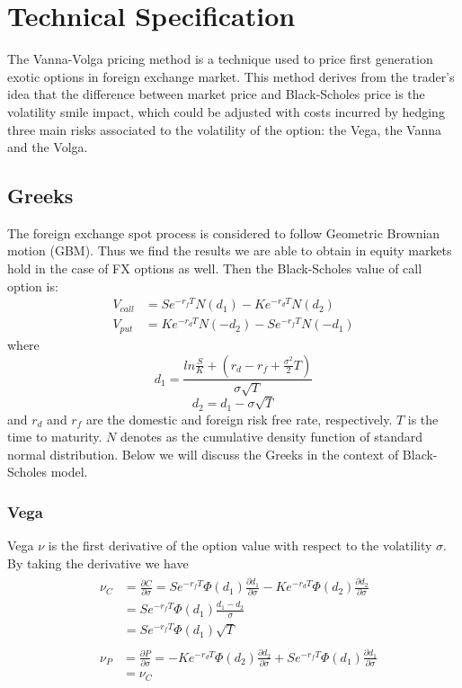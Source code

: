 \chapter{Technical Specification}

The Vanna-Volga pricing method is a technique used to price first generation exotic options in foreign exchange market. This method derives from the trader's idea that the difference between market price and Black-Scholes price is the volatility smile impact, which could be adjusted with costs incurred by hedging three main risks associated to the volatility of the option: the Vega, the Vanna and the Volga.

\section{Greeks} 
The foreign exchange spot process is considered to follow Geometric Brownian motion (GBM). Thus we find the results we are able to obtain in equity markets hold in the case of FX options as well. \newline
Then the Black-Scholes value of call option is:
\begin{align}
V_{call} &= Se^{-r_fT}N(d_1) - Ke^{-r_dT}N(d_2) \\
V_{put} &=  Ke^{-r_dT}N(-d_2) - Se^{-r_fT}N(-d_1)
\end{align}
where 
\[d_1 = \frac{ln\frac{S}{K}+\left( r_d - r_f +\frac{\sigma^2}{2}T\right) }{\sigma\sqrt{T}}\]
\[d_2 = d_1 - \sigma \sqrt{T}\]
and $r_d$ and $r_f$ are the domestic and foreign risk free rate, respectively. $T$ is the time to maturity. $N$ denotes as the cumulative density function of standard normal distribution. Below we will discuss the Greeks in the context of Black-Scholes model.

\subsection{Vega}
Vega $\nu$ is the first derivative of the option value with respect to the volatility $\sigma$. \newline
By taking the derivative we have
\begin{align}
&\begin{aligned}
\nu_C &=\frac{\partial C}{\partial \sigma} = Se^{-r_fT}\varPhi(d_1)\frac{\partial d_1}{\partial \sigma}-Ke^{-r_dT}\varPhi(d_2)\frac{\partial d_2}{\partial \sigma}\\
&= Se^{-r_fT}\varPhi(d_1)\frac{d_1 - d_2}{\sigma} \\
&=  Se^{-r_fT}\varPhi(d_1)\sqrt{T}
\end{aligned} \\
&\begin{aligned}
\nu_P &=\frac{\partial P}{\partial \sigma} =-Ke^{-r_dT}\varPhi(d_2)\frac{\partial d_2}{\partial \sigma} + Se^{-r_fT}\varPhi(d_1)\frac{\partial d_1}{\partial \sigma}\\
&= \nu_C 
\end{aligned}
\end{align}

